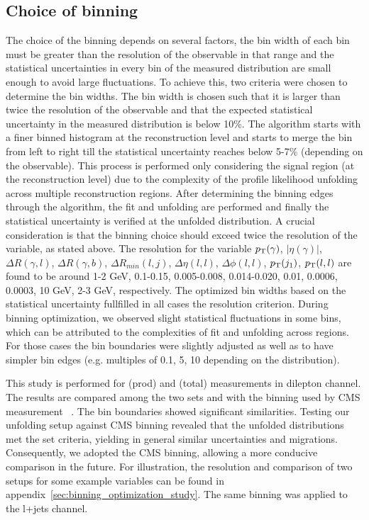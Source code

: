 \subsection{Choice of binning}
\label{sec:choice-of-binning}
The choice of the binning depends on several factors, the bin width of each bin must be greater than the resolution of the observable in that range and the statistical uncertainties in every bin of the measured distribution are small enough to avoid large fluctuations. To achieve this, two criteria were chosen to determine the bin widths. The bin width is chosen such that it is larger than twice the resolution of the observable and that the expected statistical uncertainty in the measured distribution is below 10\%. The algorithm starts with a finer binned histogram at the reconstruction level and starts to merge the bin from left to right till the statistical uncertainty reaches below 5-7\% (depending on the observable). This process is performed only considering the signal region (at the reconstruction level) due to the complexity of the profile likelihood unfolding across multiple reconstruction regions. After determining the binning edges through the algorithm, the fit and unfolding are performed and finally the statistical uncertainty is verified at the unfolded distribution. A crucial consideration is that the binning choice should exceed twice the resolution of the variable, as stated above. The resolution for the variable $p_{\text{T}}(\gamma)$, $|\eta(\gamma)|$, $\Delta R(\gamma,l)$, $\Delta R(\gamma,b)$, $\Delta R_{min}(l,j)$, $\Delta \eta(l,l)$, $\Delta \phi(l,l)$, $p_{\text{T}}(j_1)$, $p_{\text{T}}(l,l)$ are found to be around 1-2 GeV, 0.1-0.15, 0.005-0.008, 0.014-0.020, 0.01, 0.0006, 0.0003, 10 GeV, 2-3 GeV, respectively. The optimized bin widths based on the statistical uncertainty fullfilled in all cases the resolution criterion. During binning optimization, we observed slight statistical fluctuations in some bins, which can be attributed to the complexities of fit and unfolding across regions. For those cases the bin boundaries were slightly adjusted as well as to have simpler bin edges (e.g. multiples of 0.1, 5, 10 depending on the distribution). 

This study is performed for \tty(prod) and \tty(total) measurements in dilepton channel. The results are compared among the two sets and with the binning used by CMS measurement ~\cite{CMS2022}. The bin boundaries showed significant similarities. Testing our unfolding setup against CMS binning revealed that the unfolded distributions met the set criteria, yielding in general similar uncertainties and migrations. Consequently, we adopted the CMS binning, allowing a more conducive comparison in the future. For illustration, the resolution and comparison of two setups for some example variables can be found in appendix~\ref{sec:binning_optimization_study}. The same binning was applied to the l+jets channel. 

